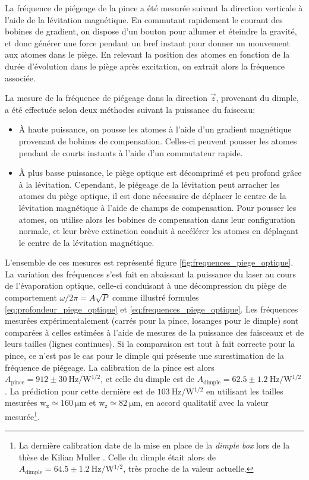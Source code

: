 La fréquence de piégeage de la pince a été mesurée suivant la direction verticale à l'aide de la lévitation magnétique. En commutant rapidement le courant des bobines de gradient, on dispose d'un bouton pour allumer et éteindre la gravité, et donc générer une force pendant un bref instant pour donner un mouvement aux atomes dans le piège. En relevant la position des atomes en fonction de la durée d'évolution dans le piège après excitation, on extrait alors la fréquence associée.

La mesure de la fréquence de piégeage dans la direction $\vec{z}$, provenant du dimple, a été effectuée selon deux méthodes suivant la puissance du faisceau:
\begin{itemize}
\item[\textendash] À haute puissance, on pousse les atomes à l'aide d'un gradient magnétique provenant de bobines de compensation. Celles-ci peuvent pousser les atomes pendant de courts instants à l'aide d'un commutateur rapide.
\item[\textendash] À plus basse puissance, le piège optique est décomprimé et peu profond grâce à la lévitation. Cependant, le piégeage de la lévitation peut arracher les atomes du piège optique, il est donc nécessaire de déplacer le centre de la lévitation magnétique à l'aide de champs de compensation. Pour pousser les atomes, on utilise alors les bobines de compensation dans leur configuration normale, et leur brève extinction conduit à accélérer les atomes en déplaçant le centre de la lévitation magnétique.
\end{itemize}

L'ensemble de ces mesures est représenté figure \ref{fig:frequences_piege_optique}. La variation des fréquences s'est fait en abaissant la puissance du laser au cours de l'évaporation optique, celle-ci conduisant à une décompression du piège de comportement $\omega /2\pi =A \sqrt{P}$ comme illustré formules \ref{eq:profondeur_piege_optique} et \ref{eq:frequences_piege_optique}. Les fréquences mesurées expérimentalement (carrés pour la pince, losanges pour le dimple) sont comparées à celles estimées à l'aide de mesures de la puissance des faisceaux et de leurs tailles (lignes continues). Si la comparaison est tout à fait correcte pour la pince, ce n'est pas le cas pour le dimple qui présente une surestimation de la fréquence de piégeage. La calibration de la pince est alors $A_{\mathrm{pince}}=912\pm \SI{30}{\hertz\per\watt^{1/2}}$, et celle du dimple est de $A_{\mathrm{dimple}}=62.5\pm \SI{1.2}{\hertz\per\watt^{1/2}}$ . La prédiction pour cette dernière est de $\SI{103}{\hertz\per\watt^{1/2}}$ en utilisant les tailles mesurées $\mathrm{w}_{\mathrm{x}} \simeq \SI{160}{\micro\metre}$ et $\mathrm{w}_{\mathrm{z}} \simeq \SI{82}{\micro\metre}$, en accord qualitatif avec la valeur mesurée\footnote{La dernière calibration date de la mise en place de la \emph{dimple box} lors de la thèse de Kilian Muller \citep{muller2015coherent}. Celle du dimple était alors de $A_{\mathrm{dimple}}=64.5\pm \SI{1.2}{\hertz\per\watt^{1/2}}$, très proche de la valeur actuelle.}. 

